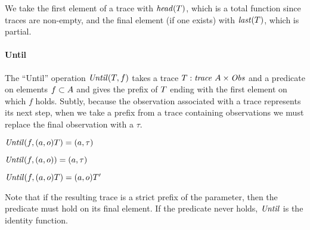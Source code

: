 \documentclass[acmsmall,review,anonymous]{acmart}\settopmatter{printfolios=true,printccs=false,printacmref=false}
\begin{document}
We take the first element of a trace with \(\mathit{head}(T)\), which is a total
function since traces are non-empty, and the final element (if one exists) with
\(\mathit{last}(T)\), which is partial.

\paragraph*{Until}
The ``Until'' operation \(\mathit{Until}(T,f)\)
takes a trace
\(T : \mathit{trace} ~ A \times \mathit{Obs}\) and a predicate
on elements \(f \subset A\) and gives the prefix of
\(T\) ending with the first element on which \(f\) holds.
Subtly, because the observation associated with a trace represents its
next step, when we take a prefix from a trace containing observations
we must replace the final observation with a \(\tau\).

  \begin{center}
  \begin{minipage}{.3\textwidth}
             {\(\mathit{Until}(f,(a,o)T) = (a,\tau)\)}
  \end{minipage}
%
  \begin{minipage}{.3\textwidth}
  \judgment{}
           {\(\mathit{Until}(f,(a,o)) = (a,\tau)\)}
%
  \end{minipage}
  \begin{minipage}{.3\textwidth}
              {\(\mathit{Until}(f,(a,o)T) = (a,o)T'\)}
  \end{minipage}
  \end{center}
%
Note that if the resulting trace is a strict prefix of the parameter, then the
predicate must hold on its final element. If the predicate never holds,
\(\mathit{Until}\) is the identity function.


\end{document}

